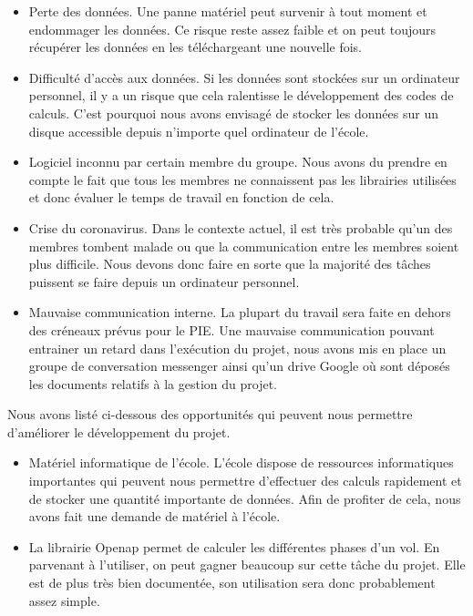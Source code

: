 \begin{itemize}
	\item Perte des données. Une panne matériel peut survenir à tout moment et endommager les données. Ce risque reste assez faible et on peut toujours récupérer les données en les téléchargeant une nouvelle fois.
	
	\item Difficulté d'accès aux données. Si les données sont stockées sur un ordinateur personnel, il y a un risque que cela ralentisse le développement des codes de calculs. C'est pourquoi nous avons envisagé de stocker les données sur un disque accessible depuis n'importe quel ordinateur de l'école.
	
	\item Logiciel inconnu par certain membre du groupe. Nous avons du  prendre en compte le fait que tous les membres ne connaissent pas les librairies utilisées et donc évaluer le temps de travail en fonction de cela.
	
	\item Crise du coronavirus. Dans le contexte actuel, il est très probable qu'un des membres tombent malade ou que la communication entre les membres soient plus difficile. Nous devons donc faire en sorte que la majorité des tâches puissent se faire depuis un ordinateur personnel.
	
	\item Mauvaise communication interne. La plupart du travail sera faite en dehors des créneaux prévus pour le PIE. Une mauvaise communication pouvant entrainer un retard dans l'exécution du projet, nous avons mis en place un groupe de conversation messenger ainsi qu'un drive Google où sont déposés les documents relatifs à la gestion du projet.
	
\end{itemize}


Nous avons listé ci-dessous des opportunités qui peuvent nous permettre d'améliorer le développement du projet.

\begin{itemize}
	\item Matériel informatique de l'école. L'école dispose de ressources informatiques importantes qui peuvent nous permettre d'effectuer des calculs rapidement et de stocker une quantité importante de données. Afin de profiter de cela, nous avons fait une demande de matériel à l'école.
	
	\item La librairie Openap permet de calculer les différentes phases d'un vol. En parvenant à l'utiliser, on peut gagner beaucoup sur cette tâche du projet. Elle est de plus très bien documentée, son utilisation sera donc probablement assez simple.
\end{itemize}
